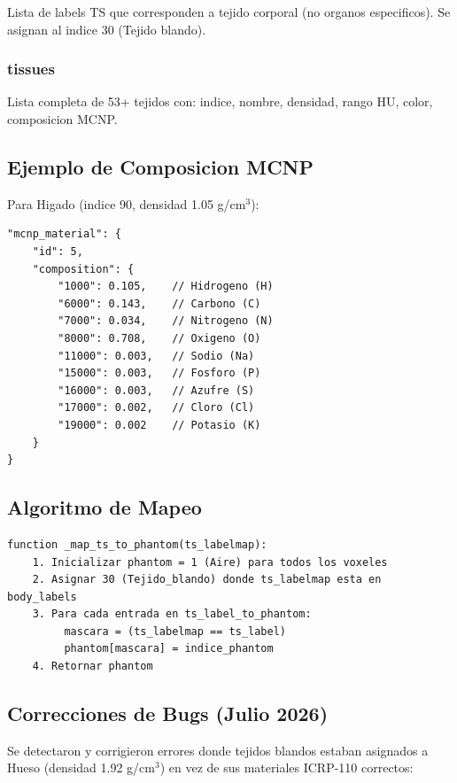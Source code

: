 \documentclass[12pt,a4paper]{article}
\begin{document}
Lista de labels TS que corresponden a tejido corporal (no organos especificos).
Se asignan al indice 30 (Tejido blando).

\subsubsection{tissues}

Lista completa de 53+ tejidos con: indice, nombre, densidad, rango HU, color, composicion MCNP.

\subsection{Ejemplo de Composicion MCNP}

Para Higado (indice 90, densidad 1.05 g/cm$^3$):

\begin{verbatim}
"mcnp_material": {
    "id": 5,
    "composition": {
        "1000": 0.105,    // Hidrogeno (H)
        "6000": 0.143,    // Carbono (C)
        "7000": 0.034,    // Nitrogeno (N)
        "8000": 0.708,    // Oxigeno (O)
        "11000": 0.003,   // Sodio (Na)
        "15000": 0.003,   // Fosforo (P)
        "16000": 0.003,   // Azufre (S)
        "17000": 0.002,   // Cloro (Cl)
        "19000": 0.002    // Potasio (K)
    }
}
\end{verbatim}

\subsection{Algoritmo de Mapeo}

\begin{verbatim}
function _map_ts_to_phantom(ts_labelmap):
    1. Inicializar phantom = 1 (Aire) para todos los voxeles
    2. Asignar 30 (Tejido_blando) donde ts_labelmap esta en body_labels
    3. Para cada entrada en ts_label_to_phantom:
         mascara = (ts_labelmap == ts_label)
         phantom[mascara] = indice_phantom
    4. Retornar phantom
\end{verbatim}

\subsection{Correcciones de Bugs (Julio 2026)}

Se detectaron y corrigieron errores donde tejidos blandos estaban asignados a Hueso (densidad
1.92 g/cm$^3$) en vez de sus materiales ICRP-110 correctos:
\end{document}
